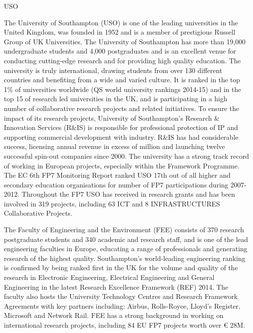 \begin{sitedescription}{USO}




  The University of Southampton (USO) is one of the leading
  universities in the United Kingdom, was founded in 1952 and is a
  member of prestigious Russell Group of UK Universities. The
  University of Southampton has more than 19,000 undergraduate
  students and 4,000 postgraduates and is an excellent venue for
  conducting cutting-edge research and for providing high quality
  education. The university is truly international, drawing students
  from over 130 different countries and benefiting from a wide and
  varied culture. It is ranked in the top 1\% of universities
  worldwide (QS world university rankings 2014-15) and in the top 15
  of research led universities in the UK, and is participating in a
  high number of collaborative research projects and related
  initiatives. To ensure the impact of its research projects,
  University of Southampton’s Research \& Innovation Services (R\&IS)
  is responsible for professional protection of IP and supporting
  commercial development with industry. R\&IS has had considerable
  success, licensing annual revenue in excess of million and
  launching twelve successful spin-out companies since 2000.  The
  university has a strong track record of working in European
  projects, especially within the Framework Programme. The EC 6th FP7
  Monitoring Report ranked USO 17th out of all higher and secondary
  education organisations for number of FP7 participations during
  2007-2012. Throughout the FP7 USO has received  in
  research grants and has been involved in 319 projects, including 63
  ICT and 8 INFRASTRUCTURES Collaborative Projects. 

  The Faculty of Engineering and the Environment (FEE) consists of 370
  research postgraduate students and 340 academic and research
  staff, and is one of the lead engineering faculties in Europe, educating
  a range of professionals and generating research of the highest
  quality. Southampton's world-leading engineering ranking is
  confirmed by being ranked first in the UK for the volume and quality
  of the research in Electronic Engineering, Electrical Engineering
  and General Engineering in the latest Research Excellence Framework
  (REF) 2014. The faculty also hosts the University Technology Centres
  and Research Framework Agreements with key partners including:
  Airbus, Rolls-Royce, Lloyd’s Register, Microsoft and Network
  Rail. FEE has a strong background in working on international
  research projects, including 84 EU FP7 projects worth over \euro
  28M.



\end{sitedescription}
